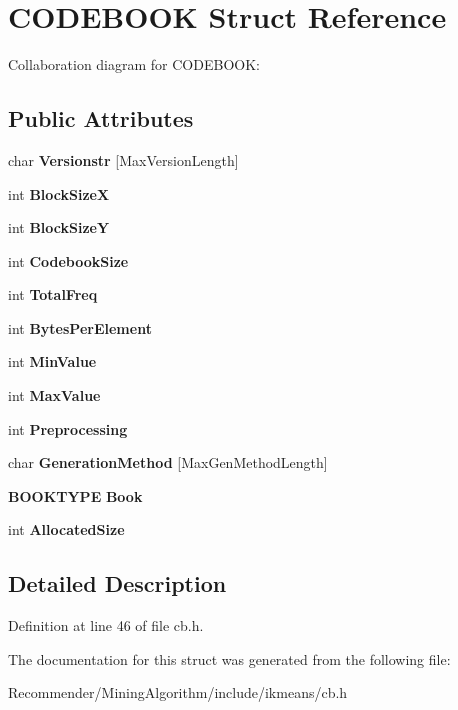 \section{CODEBOOK Struct Reference}
\label{structCODEBOOK}
Collaboration diagram for CODEBOOK:\subsection*{Public Attributes}
\begin{CompactItemize}
\item 
char {\bf Versionstr} [MaxVersionLength]\label{structCODEBOOK_86c4001739f6d6d9f36ca38cd5a8ab51}

\item 
int {\bf BlockSizeX}\label{structCODEBOOK_de76602a1d22a493cf1245bb02b38a1e}

\item 
int {\bf BlockSizeY}\label{structCODEBOOK_3ba1f2ef61e32e8a4aac1218010ff8e5}

\item 
int {\bf CodebookSize}\label{structCODEBOOK_96dcc57664c4b3f0311d25f69a577d95}

\item 
int {\bf TotalFreq}\label{structCODEBOOK_4266b9b52c837f30d9dd2ffff73ff74c}

\item 
int {\bf BytesPerElement}\label{structCODEBOOK_4c975c77e911786225cc3e60b8af377f}

\item 
int {\bf MinValue}\label{structCODEBOOK_e0fe10b69e5c30219b303cdb6a38708a}

\item 
int {\bf MaxValue}\label{structCODEBOOK_a00f84309248b8fbc4b48b4eaaaf64f6}

\item 
int {\bf Preprocessing}\label{structCODEBOOK_a77fa98bebae59723663cc61757edac2}

\item 
char {\bf GenerationMethod} [MaxGenMethodLength]\label{structCODEBOOK_3f79ee5b9ffb5b8b13c708e811340921}

\item 
{\bf BOOKTYPE} {\bf Book}\label{structCODEBOOK_0439ea40186d450084b31a2348820f54}

\item 
int {\bf AllocatedSize}\label{structCODEBOOK_6e0ac07069736ac21d14cd1520756990}

\end{CompactItemize}


\subsection{Detailed Description}




Definition at line 46 of file cb.h.

The documentation for this struct was generated from the following file:\begin{CompactItemize}
\item 
Recommender/MiningAlgorithm/include/ikmeans/cb.h\end{CompactItemize}
